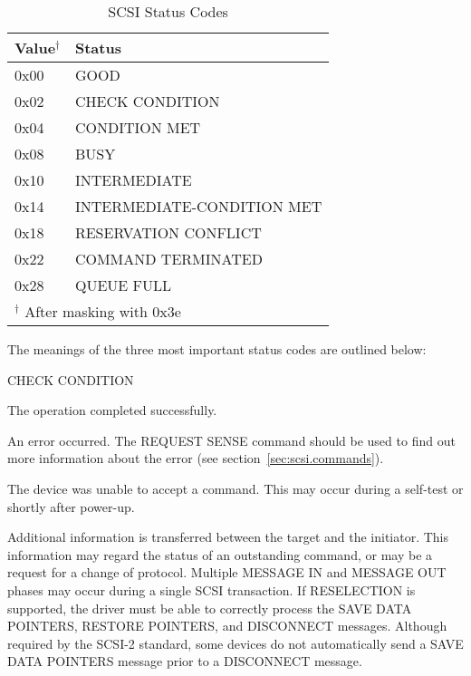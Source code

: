 \begin{description}
  \begin{table}[hbtp]
    \leavevmode
    \begin{center}
      \begin{tabular}{|l|l|} \hline
        Value${}^{\dag}$ & Status \\\hline\hline
        0x00  & GOOD \\\hline
        0x02  & CHECK CONDITION \\\hline
        0x04  & CONDITION MET \\\hline
        0x08  & BUSY \\\hline
        0x10  & INTERMEDIATE \\\hline
        0x14  & INTERMEDIATE-CONDITION MET \\\hline
        0x18  & RESERVATION CONFLICT \\\hline
        0x22  & COMMAND TERMINATED \\\hline
        0x28  & QUEUE FULL \\\hline
        \multicolumn{2}{l}{{\footnotesize ${}^{\dag}$ After masking with 0x3e}}
      \end{tabular}
      \caption{SCSI Status Codes}
      \label{tab:status}
    \end{center}
  \end{table}

  The meanings of the three most important status codes are outlined below:
  \begin{desc}{CHECK CONDITION}
  \item[GOOD] The operation completed successfully.
  \item[CHECK CONDITION] An error occurred.  The REQUEST SENSE command
    should be used to find out more information about the error (see
    section~\ref{sec:scsi.commands}).
  \item[BUSY] The device was unable to accept a command.  This may occur
    during a self-test or shortly after power-up.
  \end{desc}
\item[MESSAGE OUT and MESSAGE IN Phases] Additional information is
  transferred between the target and the initiator.  This information may
  regard the status of an outstanding command, or may be a request for a
  change of protocol.  Multiple MESSAGE IN and MESSAGE OUT phases may occur
  during a single SCSI transaction.  If RESELECTION is supported, the
  driver must be able to correctly process the SAVE DATA POINTERS, RESTORE
  POINTERS, and DISCONNECT messages.  Although required by the SCSI-2
  standard, some devices do not automatically send a SAVE DATA POINTERS
  message prior to a DISCONNECT message.
\end{description}


